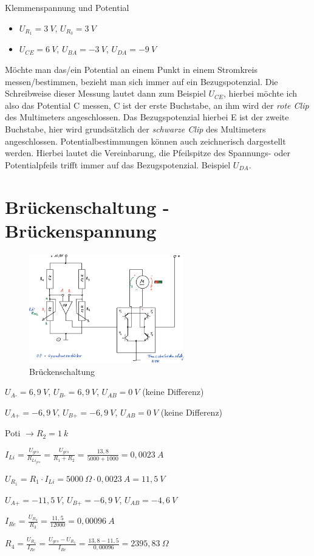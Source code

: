 Klemmenspannung und Potential

\begin{itemize}
\item
  $U_{R_1} = 3~V$, $U_{R_3} = 3~V$
\item
  $U_{CE} = 6~V$, $U_{BA} = -3~V$, $U_{DA} = -9~V$
\end{itemize}

Möchte man das/ein Potential an einem Punkt in einem Stromkreis
messen/bestimmen, bezieht man sich immer auf ein Bezugspotenzial. Die
Schreibweise dieser Messung lautet dann zum Beispiel $U_{CE}$, hierbei
möchte ich also das Potential C messen, C ist der erste Buchstabe, an
ihm wird der \emph{rote Clip} des Multimeters angeschlossen. Das
Bezugspotenzial hierbei E ist der zweite Buchstabe, hier wird
grundsätzlich der \emph{schwarze Clip} des Multimeters angeschlossen.
Potentialbestimmungen können auch zeichnerisch dargestellt werden.
Hierbei lautet die Vereinbarung, die Pfeilspitze des Spannungs- oder
Potentialpfeils trifft immer auf das Bezugspotenzial. Beispiel
$U_{DA}$.

\newpage

\section{Brückenschaltung -
Brückenspannung}\label{brueckenschaltung-brueckenspannung}

\begin{figure}[!ht]%
\centering
\includegraphics[width=0.6\textwidth]{images/Skizze/28_FT_Brueckenschaltung.pdf}
\caption{Brückenschaltung}
\end{figure}

$U_{A\text{-}} = 6,9~V$, $U_{B\text{-}} = 6,9~V$, $U_{AB} = 0~V$
(keine Differenz)

$U_{A\text{+}} = -6,9~V$, $U_{B\text{+}} = -6,9~V$, $U_{AB} = 0~V$
(keine Differenz)

Poti $\to R_2 = 1~k$

$I_{Li} = \frac{U_{ges}}{R_{{Li}_{ges}}} = \frac{U_{ges}}{R_1 + R_2} = \frac{13,8}{5000 + 1000} =0,0023~A$

$U_{R_1} = R_1 \cdot I_{Li} = 5000~\Omega \cdot 0,0023~A = 11,5~V$

$U_{A\text{+}} = -11,5~V$, $U_{B\text{+}} = -6,9~V$,
$U_{AB} = -4,6~V$

$I_{Re} = \frac{U_{R_3}}{R_3} = \frac{11,5}{12000} =0,00096~A$

$R_4 = \frac{U_{R_4}}{I_{Re}} = \frac{U_{ges} - U_{R_3}}{I_{Re}} = \frac{13,8 - 11,5}{0,00096} = 2395,83~\Omega$
